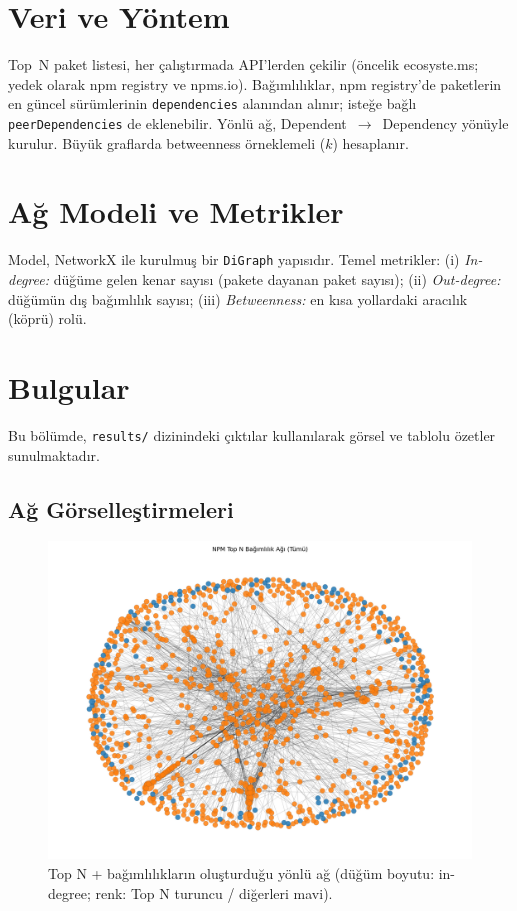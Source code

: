 \documentclass[11pt,a4paper]{article}
\begin{document}
\section{Veri ve Yöntem}
Top~N paket listesi, her çalıştırmada API'lerden çekilir (öncelik ecosyste.ms; yedek olarak npm registry ve npms.io). Bağımlılıklar, npm registry'de paketlerin en güncel sürümlerinin \texttt{dependencies} alanından alınır; isteğe bağlı \texttt{peerDependencies} de eklenebilir. Yönlü ağ, Dependent~$\to$~Dependency yönüyle kurulur. Büyük graflarda betweenness örneklemeli ($k$) hesaplanır.

\section{Ağ Modeli ve Metrikler}
Model, NetworkX ile kurulmuş bir \texttt{DiGraph} yapısıdır. Temel metrikler: (i) \emph{In-degree:} düğüme gelen kenar sayısı (pakete dayanan paket sayısı); (ii) \emph{Out-degree:} düğümün dış bağımlılık sayısı; (iii) \emph{Betweenness:} en kısa yollardaki aracılık (köprü) rolü.

\section{Bulgular}
Bu bölümde, \texttt{results/} dizinindeki çıktılar kullanılarak görsel ve tablolu özetler sunulmaktadır.

\subsection{Ağ Görselleştirmeleri}
\begin{figure}[h]
  \centering
  \includegraphics{network_full_topN.png}
  \caption{Top N + bağımlılıkların oluşturduğu yönlü ağ (düğüm boyutu: in-degree; renk: Top N turuncu / diğerleri mavi).}
\end{figure}
\end{document}
